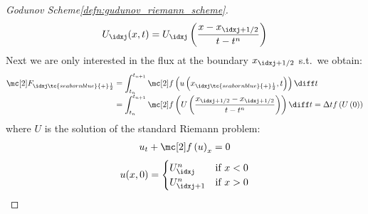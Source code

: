 \begin{proofbox}
\begin{proof}[Godunov Scheme\cref{defn:gudunov_riemann_scheme}]
        \begin{align}
          U_{\idxj}(x,t)=U_{\idxj}\left(\frac{x-x_{\idxj+1/2}}{t-t^{n}}\right)
        \end{align}
        Next we are only interested in the flux at the boundary $x_{\idxj+1/2}$ s.t.\ we obtain:
        \begin{align*}
          \Flux_{\idxj\tc{seabornblue}{+}\frac{1}{2}}
          &=\int_{t_{n}}^{t_{n+1}}\flux \left(u\left(x_{\idxj\tc{seabornblue}{+}\frac{1}{2}},t\right)\right)\diff t \\[-1\jot]
            &=\int_{t_{n}}^{t_{n+1}}\flux \left(U\left(\frac{x_{\idxj+1/2}-x_{\idxj+1/2}}{t-t^{n}}\right)\right)\diff t
            =\Delta t f \left(U\left(0\right)\right)
        \end{align*}
        where $U$ is the solution of the standard Riemann problem:
        \begin{align}
        u_{t}+\flux \left(u\right)_{x}=0
        \end{align}
        \begin{align}
            u(x,0)=\begin{cases}
                    U_{\idxj}^{n}&\text{if }x<0\\
                    U_{\idxj+1}^{n}&\text{if }x>0
                    \end{cases}
        \label{eq:riemann_problem}
        \end{align}
    \end{proof}
\end{proofbox}
